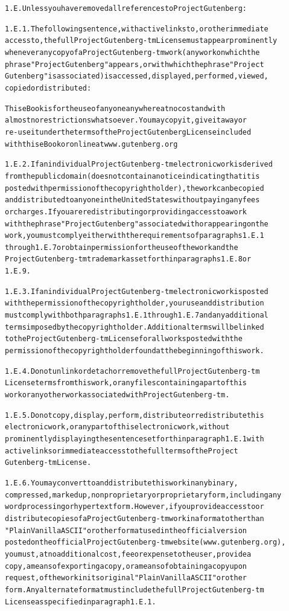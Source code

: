 \documentclass[12pt]{book}[2005/09/16]
\newenvironment{PGtext}{%
\begin{alltt}
\fontsize{8.1}{9}\ttfamily\selectfont}%
{\end{alltt}}
\begin{document}
\begin{PGtext}
1.E.  Unless you have removed all references to Project Gutenberg:

1.E.1.  The following sentence, with active links to, or other immediate
access to, the full Project Gutenberg-tm License must appear prominently
whenever any copy of a Project Gutenberg-tm work (any work on which the
phrase "Project Gutenberg" appears, or with which the phrase "Project
Gutenberg" is associated) is accessed, displayed, performed, viewed,
copied or distributed:

This eBook is for the use of anyone anywhere at no cost and with
almost no restrictions whatsoever.  You may copy it, give it away or
re-use it under the terms of the Project Gutenberg License included
with this eBook or online at www.gutenberg.org

1.E.2.  If an individual Project Gutenberg-tm electronic work is derived
from the public domain (does not contain a notice indicating that it is
posted with permission of the copyright holder), the work can be copied
and distributed to anyone in the United States without paying any fees
or charges.  If you are redistributing or providing access to a work
with the phrase "Project Gutenberg" associated with or appearing on the
work, you must comply either with the requirements of paragraphs 1.E.1
through 1.E.7 or obtain permission for the use of the work and the
Project Gutenberg-tm trademark as set forth in paragraphs 1.E.8 or
1.E.9.

1.E.3.  If an individual Project Gutenberg-tm electronic work is posted
with the permission of the copyright holder, your use and distribution
must comply with both paragraphs 1.E.1 through 1.E.7 and any additional
terms imposed by the copyright holder.  Additional terms will be linked
to the Project Gutenberg-tm License for all works posted with the
permission of the copyright holder found at the beginning of this work.

1.E.4.  Do not unlink or detach or remove the full Project Gutenberg-tm
License terms from this work, or any files containing a part of this
work or any other work associated with Project Gutenberg-tm.

1.E.5.  Do not copy, display, perform, distribute or redistribute this
electronic work, or any part of this electronic work, without
prominently displaying the sentence set forth in paragraph 1.E.1 with
active links or immediate access to the full terms of the Project
Gutenberg-tm License.

1.E.6.  You may convert to and distribute this work in any binary,
compressed, marked up, nonproprietary or proprietary form, including any
word processing or hypertext form.  However, if you provide access to or
distribute copies of a Project Gutenberg-tm work in a format other than
"Plain Vanilla ASCII" or other format used in the official version
posted on the official Project Gutenberg-tm web site (www.gutenberg.org),
you must, at no additional cost, fee or expense to the user, provide a
copy, a means of exporting a copy, or a means of obtaining a copy upon
request, of the work in its original "Plain Vanilla ASCII" or other
form.  Any alternate format must include the full Project Gutenberg-tm
License as specified in paragraph 1.E.1.


\end{PGtext}
\end{document}
